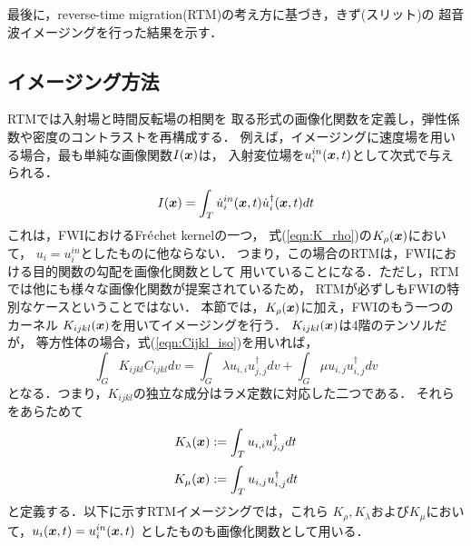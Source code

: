 ﻿最後に，reverse-time migration(RTM)の考え方に基づき，きず(スリット)の
超音波イメージングを行った結果を示す．
\subsection{イメージング方法}
RTMでは入射場と時間反転場の相関を
取る形式の画像化関数を定義し，弾性係数や密度のコントラストを再構成する．
例えば，イメージングに速度場を用いる場合，最も単純な画像関数$I(\boldsymbol{x})$は，
入射変位場を$u_i^{in}(\boldsymbol{x},t)$として次式で与えられる．
\begin{equation}
	I(\boldsymbol{x})=\int_T \dot u^{in}_i(\boldsymbol{x},t) \dot u_i^{\dagger}(\boldsymbol{x},t)dt
	\label{eqn:Ix}
\end{equation}
これは，FWIにおけるFr$\acute{\rm e}$chet kernelの一つ，
式(\ref{eqn:K_rho})の$K_\rho(\boldsymbol{x})$において，
$u_i=u_i^{in}$としたものに他ならない．
つまり，この場合のRTMは，FWIにおける目的関数の勾配を画像化関数として
用いていることになる．ただし，RTMでは他にも様々な画像化関数が提案されているため\cite{Jones}，
RTMが必ずしもFWIの特別なケースということではない．
本節では，$K_\rho(\boldsymbol{x})$に加え，FWIのもう一つのカーネル
$K_{ijkl}(\boldsymbol{x})$を用いてイメージングを行う．
$K_{ijkl}(\boldsymbol{x})$は4階のテンソルだが，
等方性体の場合，式(\ref{eqn:Cijkl_iso})を用いれば，
\begin{equation}
	\int_G K_{ijkl}C_{ijkl}dv
	=
	\int_G \lambda u_{i,i}u^{\dagger}_{j,j} dv
	+
	\int_G \mu u_{i,j}u^{\dagger}_{i,j} dv
	\label{eqn:}
\end{equation}
となる．つまり，$K_{ijkl}$の独立な成分はラメ定数に対応した二つである．
それらをあらためて
\begin{equation}
	K_\lambda(\boldsymbol{x}):= \int_T u_{i,i}u^{\dagger}_{j,j} dt
	\label{eqn:K_lmb}
\end{equation}
\begin{equation}
	K_\mu(\boldsymbol{x}):= \int_T u_{i,j}u^{\dagger}_{i,j} dt
	\label{eqn:K_mu}
\end{equation}
と定義する．以下に示すRTMイメージングでは，これら
$K_\rho, K_\lambda$および$K_\mu$において，$u_i(\boldsymbol{x},t)=u_i^{in}(\boldsymbol{x},t)$
としたものも画像化関数として用いる．
